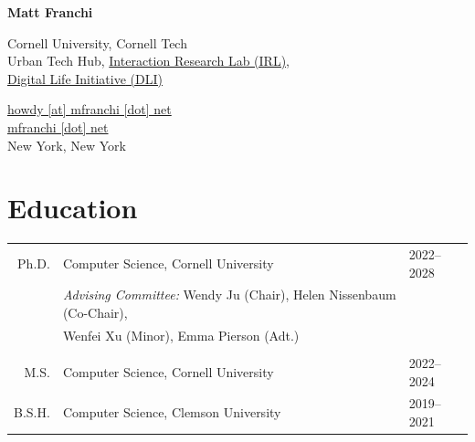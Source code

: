 \documentclass[10pt,letterpaper]{report}
\newcommand{\myname}{{Matt Franchi}}
\newif\ifshowresearch
\newcommand{\namefont}[1]{{\normalfont\bfseries\Huge{#1}}}
\begin{document}
    \raggedright{}

    \namefont{\myname}

    \vspace{1em}
    \begin{minipage}[t]{0.6\textwidth}
         Cornell University, Cornell Tech \\ 
         Urban Tech Hub, \href{https://irl.tech.cornell.edu}{Interaction Research Lab (IRL),\\ \href{https://dli.tech.cornell.edu}{Digital Life Initiative} (DLI)}
    \end{minipage}
    \begin{minipage}[t]{0.39\textwidth}
        \flushright{}
        \href{mailto:howdy@mfranchi.net}{howdy [at] mfranchi [dot] net} \\
        \href{https://mfranchi.net}{mfranchi [dot] net} \\ 
        New York, New York
    \end{minipage}


    \section*{Education}

    \begin{tabular}{r| l l}
    Ph.D. & Computer Science, Cornell University & 2022--2028 \\
    & \textit{Advising Committee:} Wendy Ju (Chair), Helen Nissenbaum (Co-Chair),\\
    & \hspace{9em}Wenfei Xu (Minor), Emma Pierson (Adt.) \\
    & \\
    M.S. & Computer Science, Cornell University & 2022--2024 \\
    B.S.H. & Computer Science, Clemson University & 2019--2021 \\
    \end{tabular}

    \ifshowresearch
\end{document}

